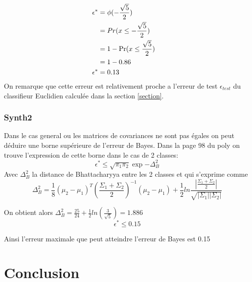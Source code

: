 \documentclass[10pt]{article}
\begin{document}
\begin{align}
 \epsilon^{*}  &=  \phi(-\frac{\sqrt{5}}{2}) \cr
& =  Pr(x \leq -\frac{\sqrt{5}}{2}) \cr
 &= 1 - \Pr(x \leq \frac{\sqrt{5}}{2})\cr
 & = 1 - 0.86\cr
 \epsilon^{*}  & = 0.13
\end{align}
On remarque  que cette erreur est relativement proche a l'erreur de test $\epsilon_{test}$ du classifieur Euclidien calculée dans la section \ref{section}. 



\subsubsection{Synth2}
Dans le cas general ou les matrices de covariances ne sont pas égales on peut déduire une borne supérieure de l'erreur de Bayes. Dans la page 98 du  poly on trouve l'expression de cette borne dans le  cas de 2 classes:
\[ \epsilon^{*} \leq \sqrt{\pi_{1}\pi_{2}}  \exp{-\Delta_{B}^{2}} \]
Avec $\Delta_{B}^{2}$ la distance de Bhattacharyya entre les 2 classes et qui s'exprime comme 
\[  \Delta_{B}^{2} = \frac{1}{8} (\mu_{2} - \mu_{1})^{T}  (\frac{\Sigma_{1} + \Sigma_{2}}{2})^{-1} (\mu_{2} - \mu_{1}) + 
\frac{1}{2} ln\frac{|\frac{\Sigma_{1}+\Sigma_{2}}{2}|}{\sqrt{|\Sigma_{1}| |\Sigma_{2}|}} \]

On obtient alors $\Delta_{B}^{2} = \frac{25}{24} +\frac{1}{2} ln(\frac{3}{\sqrt{5}} ) = 1.886$
\[  \epsilon^{*} \leq 0.15\]

Ainsi l'erreur maximale que peut atteindre l'erreur de Bayes est 0.15

\section{Conclusion}
	
\end{document}
